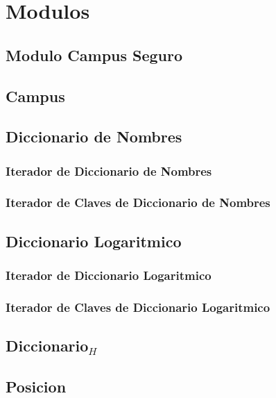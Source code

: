 \documentclass[a4paper,10pt, nofootinbib]{article}
\begin{document}

\section{Modulos}
\subsection{Modulo Campus Seguro}

\newpage
\subsection{Campus}

\newpage
\subsection{Diccionario de Nombres}

\newpage
\subsubsection{Iterador de Diccionario de Nombres}

\newpage
\subsubsection{Iterador de Claves de Diccionario de Nombres}


\newpage
\subsection{Diccionario Logaritmico}

\subsubsection{Iterador de Diccionario Logaritmico}

\subsubsection{Iterador de Claves de Diccionario Logaritmico}


\newpage
\subsection{Diccionario$_H$}

\clearpage
\subsection{Posicion}

\clearpage
\end{document}
